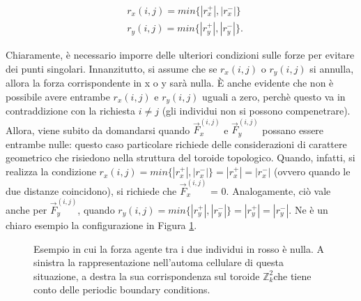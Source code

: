 \documentclass[letterpaper,10pt]{article}
\newcommand{\Zii}{$\mathbb{Z}^2_k$}
\begin{document}
\begin{equation}
\begin{aligned} 
&r_x(i,j) = min\{|r_x^+|, |r_x^-|\}\\
&r_y(i,j) = min\{|r_y^+|, |r_y^-|\}.
\end{aligned}
\label{Eq:6}
\end{equation}

Chiaramente, è necessario imporre delle ulteriori condizioni sulle forze per evitare dei punti singolari. Innanzitutto, si assume che se $r_x(i,j)$ o $r_y(i,j)$ si annulla, allora la forza corrispondente in x o y sarà nulla. È anche evidente che non è possibile avere entrambe $r_x(i,j)$ e $r_y(i,j)$ uguali a zero, perchè questo va in contraddizione con la richiesta $i\neq j$ (gli individui non si possono compenetrare). 
\\Allora, viene subito da domandarsi quando $\vec{F}^{(i,j)}_x$ e $\vec{F}^{(i,j)}_y$ possano essere entrambe nulle: questo caso particolare richiede delle considerazioni di carattere geometrico che risiedono nella struttura del toroide topologico. Quando, infatti, si realizza la condizione $r_x(i,j) = min\{|r_x^+|, |r_x^-|\} = |r_x^+| = |r_x^-|$ (ovvero quando le due distanze coincidono), si richiede che $\vec{F}^{(i,j)}_x$ = 0. Analogamente, ciò vale anche per $\vec{F}^{(i,j)}_y$, quando $r_y(i,j) = min\{|r_y^+|, |r_y^-|\} = |r_y^+| = |r_y^-|$. Ne è un chiaro esempio la configurazione in Figura \ref{Fig:8}.

\begin{figure}[hb]
\centering
\begin{subfigure}[h]{0.48\textwidth}
\centering
{}
\end{subfigure}
\hfill
\begin{subfigure}[h]{0.48\textwidth}
         \centering
{}
\end{subfigure}
\caption{Esempio in cui la forza agente tra i due individui in rosso è nulla. A sinistra la rappresentazione nell'automa cellulare di questa situazione, a destra la sua corrispondenza sul toroide \Zii  che tiene conto delle periodic boundary conditions.}
\label{Fig:8}
\end{figure}
\end{document}

